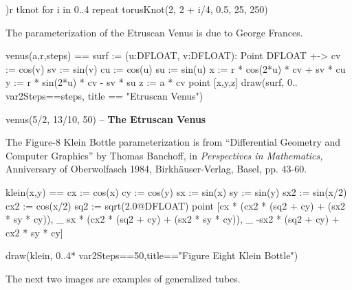 \begin{xmpLinesPlain}
)r tknot
for i in 0..4 repeat torusKnot(2, 2 + i/4, 0.5, 25, 250)
\end{xmpLinesPlain}


The parameterization of the Etruscan Venus is due to George Frances.

\begin{xmpLinesPlain}
venus(a,r,steps) ==
  surf := (u:DFLOAT, v:DFLOAT): Point DFLOAT +->
    cv := cos(v)
    sv := sin(v)
    cu := cos(u)
    su := sin(u)
    x := r * cos(2*u) * cv + sv * cu
    y := r * sin(2*u) * cv - sv * su
    z := a * cv
    point [x,y,z]
  draw(surf, 0..%
       var2Steps==steps, title == "Etruscan Venus")

venus(5/2, 13/10, 50)                                    -- \textbf{The Etruscan Venus}
\end{xmpLinesPlain}

The Figure-8 Klein Bottle
parameterization is from
``Differential Geometry and Computer Graphics'' by Thomas Banchoff,
in {\it Perspectives in Mathematics,} Anniversary of Oberwolfasch 1984,
Birkh\"{a}user-Verlag, Basel, pp. 43-60.

\begin{xmpLinesNoResetPlain}
klein(x,y) ==
  cx := cos(x)
  cy := cos(y)
  sx := sin(x)
  sy := sin(y)
  sx2 := sin(x/2)
  cx2 := cos(x/2)
  sq2 := sqrt(2.0@DFLOAT)
  point [cx * (cx2 * (sq2 + cy) + (sx2 * sy * cy)), _
         sx * (cx2 * (sq2 + cy) + (sx2 * sy * cy)), _
         -sx2 * (sq2 + cy) + cx2 * sy * cy]

draw(klein, 0..4*%
     var2Steps==50,title=="Figure Eight Klein Bottle")
\end{xmpLinesNoResetPlain}

The next two images are examples of generalized tubes.

